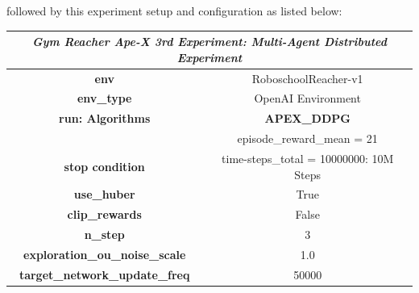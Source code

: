 followed by this experiment setup and configuration as listed below:
\begin{table}[!htb]
	\centering
	\begin{tabular}{|c|l|l|c|l|l|}
		\hline
		\multicolumn{6}{|c|}{\textit{\textbf{Gym Reacher Ape-X 3rd Experiment: Multi-Agent Distributed Experiment}}}                                                        \\ \hline
		\multicolumn{3}{|c|}{\textbf{env}}                                            & \multicolumn{3}{c|}{RoboschoolReacher-v1}                                            \\ \hline
		\multicolumn{3}{|c|}{\textbf{env\_type}}                                      & \multicolumn{3}{c|}{OpenAI Environment}                                              \\ \hline
		\multicolumn{3}{|c|}{\textbf{run: Algorithms}}                                & \multicolumn{3}{c|}{\cellcolor[HTML]{C0C0C0}\textbf{APEX\_DDPG}}                     \\ \hline
		\multicolumn{3}{|c|}{}                                                        & \multicolumn{3}{c|}{\cellcolor[HTML]{E1F7E1}episode\_reward\_mean = 21}              \\ \cline{4-6} 
		\multicolumn{3}{|c|}{\multirow{-2}{*}{\textbf{stop condition}}}               & \multicolumn{3}{c|}{\cellcolor[HTML]{E1F7E1}time-steps\_total = 10000000: 10M Steps} \\ \hline
		\multicolumn{3}{|c|}{\textbf{use\_huber}}                                     & \multicolumn{3}{c|}{True}                                                            \\ \hline
		\multicolumn{3}{|c|}{\textbf{clip\_rewards}}                                  & \multicolumn{3}{c|}{False}                                                           \\ \hline
		\multicolumn{3}{|c|}{\textbf{n\_step}}                                        & \multicolumn{3}{c|}{3}                                                               \\ \hline
		\multicolumn{3}{|c|}{\textbf{exploration\_ou\_noise\_scale}}                  & \multicolumn{3}{c|}{1.0}                                                             \\ \hline
		\multicolumn{3}{|c|}{\textbf{target\_network\_update\_freq}}                  & \multicolumn{3}{c|}{50000}                                                           \\ \hline

\end{tabular}
\end{table}
